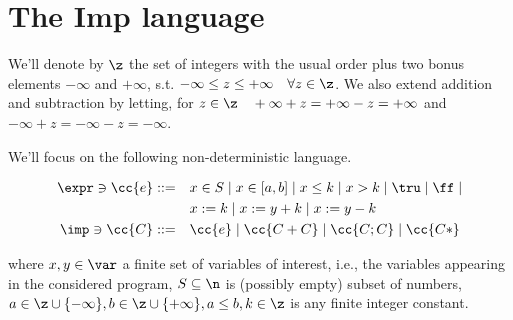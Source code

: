 \section{The Imp language}

We'll denote by \(\z\) the set of integers with the usual order plus
two bonus elements \(-\infty\) and \(+\infty\), s.t. \(-\infty \leq z
\leq +\infty \quad \forall z \in \z\). We also extend addition and
subtraction by letting, for \(z \in \z \quad +\infty + z = + \infty -
z = + \infty\) and \(-\infty + z = - \infty -z = - \infty\).

We'll focus on the following non-deterministic language.

\begin{align*}
  \expr \ni \cc{e} ::= & \quad x \in S \mid x \in [a,b] \mid x \leq k \mid x > k \mid \tru \mid \ff \mid \\
  & \quad x := k \mid x := y + k \mid x := y - k \\
  \imp \ni \cc{C} ::= & \quad \cc{e} \mid \cc{C + C} \mid \cc{C ; C} \mid \cc{C*}
\end{align*}

where \(x, y \in \var\) a finite set of variables of interest, i.e.,
the variables appearing in the considered program, \(S\subseteq \n\)
is (possibly empty) subset of numbers, \(a \in \z\cup \{-\infty\},
b\in\z\cup\{+\infty\}, a\leq b, k \in \z\) is any finite integer
constant.
